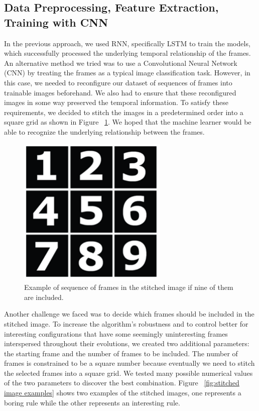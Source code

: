 \documentclass[12pt]{article}
\numberwithin{figure}{section} %
\begin{document}
\subsection{Data Preprocessing, Feature Extraction, Training with CNN}
In the previous approach, we used RNN, specifically LSTM to train the models, which successfully processed the underlying temporal relationship of the frames. An alternative method we tried was to use a Convolutional Neural Network (CNN) by treating the frames as a typical image classification task. However, in this case, we needed to reconfigure our dataset of sequences of frames into trainable images beforehand. We also had to ensure that these reconfigured images in some way preserved the temporal information. To satisfy these requirements, we decided to stitch the images in a predetermined order into a square grid as shown in Figure ~\ref{fig:stitched square grid}. We hoped that the machine learner would be able to recognize the underlying relationship between the frames. 
 
\begin{figure}[H]
\centering
\includegraphics[width=0.3\linewidth]{Section3/2}
\caption[Stitched square grid]{Example of sequence of frames in the stitched image if nine of them are included.}
\vspace{-1.5em}
\label{fig:stitched square grid}
\end{figure}
Another challenge we faced was to decide which frames should be included in the stitched image. To increase the algorithm’s robustness and to control better for interesting configurations that have some seemingly uninteresting frames interspersed throughout their evolutions, we created two additional parameters: the starting frame and the number of frames to be included. The number of frames is constrained to be a square number because eventually we need to stitch the selected frames into a square grid. We tested many possible numerical values of the two parameters to discover the best combination. Figure ~\ref{fig:stitched image examples} shows two examples of the stitched images, one represents a boring rule while the other represents an interesting rule. 
\end{document}
